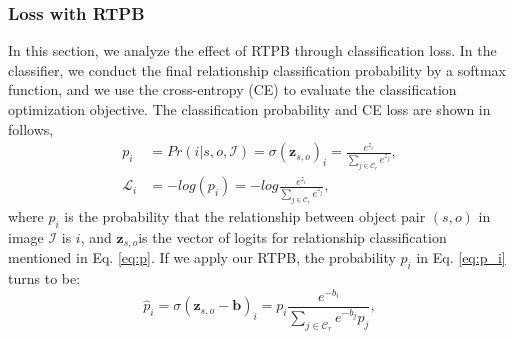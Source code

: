 \subsubsection{Loss with RTPB}
In this section, we analyze the effect of RTPB through classification loss. In the classifier, we conduct the final relationship classification probability by a softmax function, and we use the cross-entropy (CE) to evaluate the classification optimization objective. 
The  classification probability and CE loss are shown in follows,
\begin{align}
 p_i & = Pr(i|s,o,\mathcal{I}) = \sigma (\mathbf{z}_{s,o})_i = \frac{e^{z_{i}}}{\sum_{j\in\mathcal{C}_r}e^{z_{j}}}, \label{eq:p_i}\\
\mathcal{L}_i & = -log(p_i) = -log \frac{e^{z_{i}}}{\sum_{j\in \mathcal{C}_r}e^{z_{j}}}, \label{eq:l_i}
\end{align}
where $p_i$ is the probability that the relationship between object pair $(s,o)$ in image $\mathcal{I}$ is $i$, and $\mathbf{z}_{s,o} $is the vector of logits for relationship classification mentioned in Eq. \eqref{eq:p}. If we apply our RTPB, the probability $p_i$ in Eq. \eqref{eq:p_i} turns to be:
\begin{equation*}
	\hat{p}_i = \sigma ({\mathbf{z}}_{s,o} - \mathbf{b})_i = p_i\frac{e^{ -b_{i}}}{\sum_{j\in \mathcal{C}_r}e^{-b_{j}} p_j},
\end{equation*}
